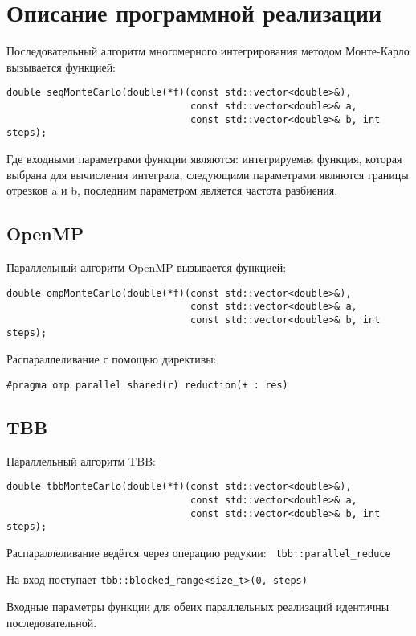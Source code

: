 \documentclass{report}
\begin{document}
\section*{Описание программной реализации}
\par Последовательный алгоритм многомерного интегрирования методом Монте-Карло вызывается функцией:
\begin{lstlisting}
double seqMonteCarlo(double(*f)(const std::vector<double>&),
                                const std::vector<double>& a,
                                const std::vector<double>& b, int steps);
\end{lstlisting}
\par Где входными параметрами функции являются: интегрируемая функция, которая выбрана для вычисления интеграла, следующими параметрами являются границы отрезков a и b, последним параметром является частота разбиения.
\subsection*{OpenMP}
\par Параллельный алгоритм OpenMP вызывается функцией:
\begin{lstlisting}
double ompMonteCarlo(double(*f)(const std::vector<double>&),
                                const std::vector<double>& a,
                                const std::vector<double>& b, int steps);
\end{lstlisting}
\par Распараллеливание с помощью директивы:
\par\verb|#pragma omp parallel shared(r) reduction(+ : res)|
\subsection*{TBB}
\par Параллельный алгоритм TBB:
\begin{lstlisting}
double tbbMonteCarlo(double(*f)(const std::vector<double>&),
                                const std::vector<double>& a,
                                const std::vector<double>& b, int steps);
\end{lstlisting}
\par Распараллеливание ведётся через операцию редукии: \verb| tbb::parallel_reduce|
\par На вход поступает \verb|tbb::blocked_range<size_t>(0, steps)|
\par Входные параметры функции для обеих параллельных реализаций идентичны последовательной.
\end{document}
